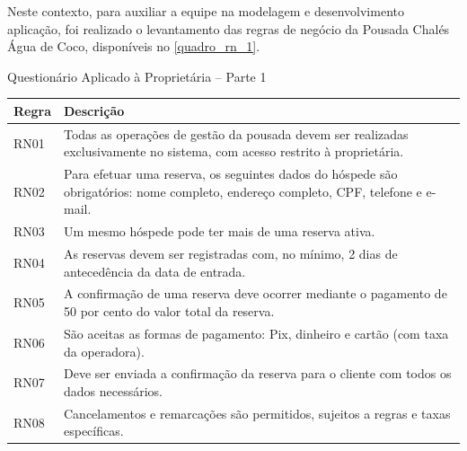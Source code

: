 \documentclass[
	12pt,				%
	openany,			%
	oneside,			%
	a4paper,			%
	english,			%
	french,				%
	spanish,			%
	brazil				%
	]{abntex2}
\begin{document}
Neste contexto, para auxiliar a equipe na modelagem e desenvolvimento aplicação, foi realizado o levantamento das regras de negócio da Pousada Chalés Água de Coco, disponíveis no \autoref{quadro_rn_1}. 
  \\
%
\begin{quadro}[H]
	\caption{Questionário Aplicado à Proprietária – Parte 1}
	\label{quadro_rn_1}
	\begin{tabular}{|>{\centering\arraybackslash}p{3cm}|p{11cm}|}
		\hline
		\textbf{Regra} & \textbf{Descrição} 
		 \\ \hline	
		RN01 &  Todas as operações de gestão da pousada devem ser realizadas exclusivamente no sistema, com acesso restrito à proprietária.   
		\\ \hline
		RN02 & Para efetuar uma reserva, os seguintes dados do hóspede são obrigatórios: nome completo, endereço completo, CPF, telefone e e-mail.
		 \\ \hline
		RN03 & Um mesmo hóspede pode ter mais de uma reserva ativa. 
		 \\ \hline
		RN04 &  As reservas devem ser registradas com, no mínimo, 2 dias de antecedência da data de entrada. 
		\\ \hline
		RN05 & A confirmação de uma reserva deve ocorrer mediante o pagamento de 50 por cento do valor total da reserva.  
		\\ \hline
		RN06 & São aceitas as formas de pagamento: Pix, dinheiro e cartão (com taxa da operadora). 
		\\ \hline
		RN07 & Deve ser enviada a confirmação da reserva para o cliente com todos os dados necessários.  
		\\ \hline
		RN08 &  Cancelamentos e remarcações são permitidos, sujeitos a regras e taxas específicas.  
		\\ \hline
	\end{tabular}
\end{quadro}
%
\end{document}
